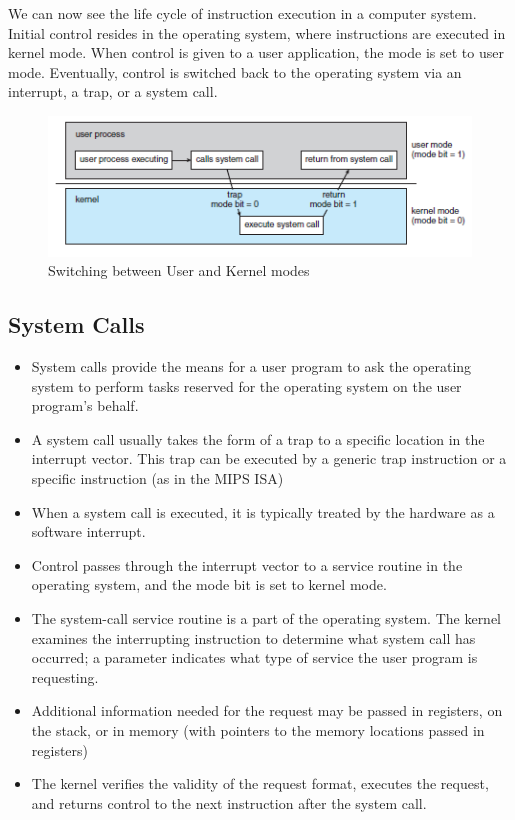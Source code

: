 \documentclass{article}
\theoremstyle{plain}
\theoremstyle{definition}
\begin{document}
We can now see the life cycle of instruction execution in a computer system. Initial control resides in the operating system, where instructions are executed in kernel mode. When control is given to a user application, the mode is set to
user mode. Eventually, control is switched back to the operating system via an interrupt, a trap, or a system call.

\begin{figure}
    \centering
    \includegraphics{os6.png}
    \caption{Switching between User and Kernel modes}
    \label{fig:my_label_6}
\end{figure}

\subsection{System Calls}

\begin{itemize}
    \item System calls provide the means for a user program to ask the operating system to perform tasks reserved for the operating system on the user program’s behalf.
    
    \item A system call usually takes the form of a trap to a specific location in the interrupt vector. This trap can be executed by a generic trap instruction or a specific instruction (as in the MIPS ISA)
    
    \item When a system call is executed, it is typically treated by the hardware as a software interrupt. 
    
    \item Control passes through the interrupt vector to a service routine in the operating system, and the mode bit is set to kernel mode.
    
    \item The system-call service routine is a part of the operating system. The kernel examines the interrupting instruction to determine what system call has occurred; a parameter indicates what type of service the user program is requesting.

    \item Additional information needed for the request may be passed in registers, on the stack, or in memory (with pointers to the memory locations passed in registers)
    
    \item The kernel verifies the validity of the request format, executes the request, and returns control to the next instruction after the system call.
\end{itemize}
\end{document}
